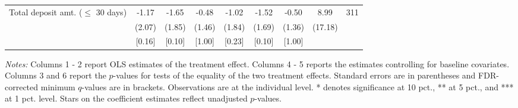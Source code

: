 \begin{table}[htbp]
{\begin{threeparttable}
\begin{tabular}{l*{8}{c}}
Total deposit amt. ($\leq$ 30 days)&    -1.17&    -1.65&    -0.48&    -1.02&    -1.52&    -0.50&     8.99&      311\\
          &   (2.07)&   (1.85)&   (1.46)&   (1.84)&   (1.69)&   (1.36)&  (17.18)&         \\
          &   [0.16]&   [0.10]&   [1.00]&   [0.23]&   [0.10]&   [1.00]&         &         \\
\bottomrule \end{tabular} \begin{tablenotes}[flushleft] \footnotesize \item \emph{Notes:} Columns 1 - 2 report OLS estimates of the treatment effect. Columns 4 - 5 reports the estimates controlling for baseline covariates. Columns 3 and 6 report the \(p\)-values for tests of the equality of the two treatment effects. Standard errors are in parentheses and FDR-corrected minimum \(q\)-values are in brackets. Observations are at the individual level. * denotes significance at 10 pct., ** at 5 pct., and *** at 1 pct. level. Stars on the coefficient estimates reflect unadjusted \(p\)-values. \end{tablenotes} \end{threeparttable} } \end{table}

